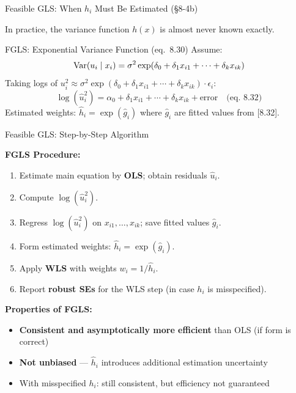 \documentclass[aspectratio=169, 12pt]{beamer}
\begin{document}
\begin{frame}{Feasible GLS: When $h_i$ Must Be Estimated (\S8-4b)}

  In practice, the variance function $h(x)$ is almost never known exactly.

  \smallskip

  \begin{definitionbox}{FGLS: Exponential Variance Function (eq.\ 8.30)}
    Assume:
    \[
      \operatorname{Var}(u_i \mid x_i) = \sigma^2 \exp(\delta_0 + \delta_1 x_{i1} + \cdots + \delta_k x_{ik})
    \]
    Taking logs of $u_i^2 \approx \sigma^2 \exp(\delta_0 + \delta_1 x_{i1} + \cdots + \delta_k x_{ik}) \cdot \epsilon_i$:
    \[
      \log(\hat{u}_i^2) = \alpha_0 + \delta_1 x_{i1} + \cdots + \delta_k x_{ik} + \text{error}
      \quad \text{(eq.\ 8.32)}
    \]
    Estimated weights: $\hat{h}_i = \exp(\hat{g}_i)$ where $\hat{g}_i$ are fitted values from [8.32].
  \end{definitionbox}

\end{frame}

\begin{frame}{Feasible GLS: Step-by-Step Algorithm}

  \begin{highlightbox}
    \textbf{FGLS Procedure:}
    \begin{enumerate}
      \item Estimate main equation by \textbf{OLS}; obtain residuals $\hat{u}_i$.
      \item Compute $\log(\hat{u}_i^2)$.
      \item Regress $\log(\hat{u}_i^2)$ on $x_{i1}, \ldots, x_{ik}$; save fitted values $\hat{g}_i$.
      \item Form estimated weights: $\hat{h}_i = \exp(\hat{g}_i)$.
      \item Apply \textbf{WLS} with weights $w_i = 1/\hat{h}_i$.
      \item Report \textbf{robust SEs} for the WLS step (in case $h_i$ is misspecified).
    \end{enumerate}
  \end{highlightbox}

  \smallskip

  \begin{keybox}
    \textbf{Properties of FGLS:}
    \begin{itemize}
      \item \textbf{Consistent and asymptotically more efficient} than OLS (if form is correct)
      \item \textbf{Not unbiased} — $\hat{h}_i$ introduces additional estimation uncertainty
      \item With misspecified $h_i$: still consistent, but efficiency not guaranteed
    \end{itemize}
  \end{keybox}

\end{frame}
\end{document}
